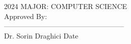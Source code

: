 \begin{flushleft}
    \vspace*{-0.20in}
    \hspace*{3.09in}2024 %
    \hspace*{3.09in}MAJOR: COMPUTER SCIENCE\\ %
    \hspace*{3.09in}Approved By:\\
     \vspace{1cm}
     \hspace*{3.09in}---------------------------------------------------\\
    \vspace*{-0.25in}
    \hspace*{3.09in}Dr. Sorin Draghici\hspace*{1in} Date\hspace*{0.1in}\\
\end{flushleft}
